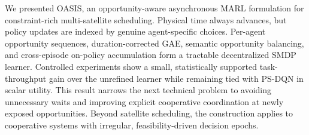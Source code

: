 \documentclass[letterpaper]{article}
\begin{document}
We presented OASIS, an opportunity-aware asynchronous MARL formulation for constraint-rich multi-satellite scheduling.  Physical time always advances, but policy updates are indexed by genuine agent-specific choices.  Per-agent opportunity sequences, duration-corrected GAE, semantic opportunity balancing, and cross-episode on-policy accumulation form a tractable decentralized SMDP learner.  Controlled experiments show a small, statistically supported task-throughput gain over the unrefined learner while remaining tied with PS-DQN in scalar utility.  This result narrows the next technical problem to avoiding unnecessary waits and improving explicit cooperative coordination at newly exposed opportunities.  Beyond satellite scheduling, the construction applies to cooperative systems with irregular, feasibility-driven decision epochs.


\end{document}
